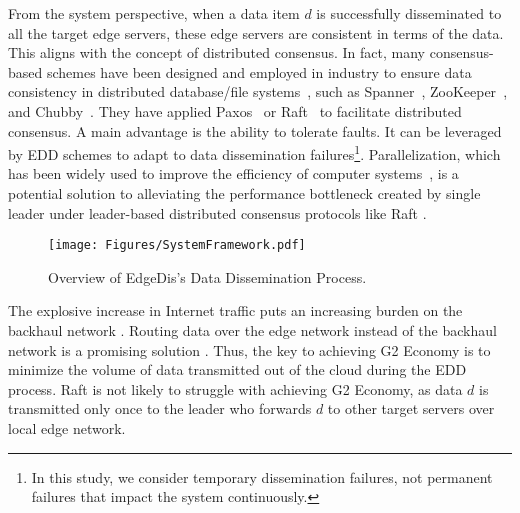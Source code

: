 \documentclass[10pt,journal,compsoc]{IEEEtran}
\begin{document}
From the system perspective, when a data item $d$ is successfully disseminated to all the target edge servers, these edge servers are consistent in terms of the data. This aligns with the concept of distributed consensus. In fact, many consensus-based schemes have been designed and employed in industry to ensure data consistency in distributed database/file systems~\cite{ skrzypczak2020rmwpaxos, tollman2021epaxos}, such as Spanner~\cite{corbett2013spanner}, ZooKeeper~\cite{hunt2010zookeeper}, and Chubby~\cite{burrows2006chubby}. They have applied Paxos~\cite{lamport2001paxos} or Raft~\cite{ongaro2014Raft} to facilitate distributed consensus. A main advantage is the ability to tolerate faults. It can be leveraged by EDD schemes to adapt to data dissemination failures\footnote{In this study, we consider temporary dissemination failures, not permanent failures that impact the system continuously.}. Parallelization, which has been widely used to improve the efficiency of computer systems~\cite{MLSYS2022_d96409bf,9472938}, is a potential solution to alleviating the performance bottleneck created by single leader under leader-based distributed consensus protocols like Raft \cite{ongaro2014Raft}.


\begin{figure*}
  \centering
        \texttt{[image: Figures/SystemFramework.pdf]}
    \vspace{-1em}
        \caption{Overview of EdgeDis's Data Dissemination Process. }        
    \vspace{-1em}
        \label{Fig:EdgeDis_Scheme}
\end{figure*}


The explosive increase in Internet traffic puts an increasing burden on the backhaul network \cite{xia2021ol}. Routing data over the edge network instead of the backhaul network is a promising solution \cite{landa2021staying, yap2017taking, schlinker2017engineering}. Thus, the key to achieving G2 Economy is to minimize the volume of data transmitted out of the cloud during the EDD process. Raft is not likely to struggle with achieving G2 Economy, as data $d$ is transmitted only once to the leader who forwards $d$ to other target servers over local edge network.
\end{document}
